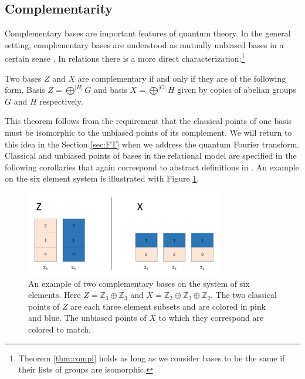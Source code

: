 \subsection{Complementarity}
Complementary bases are important features of quantum theory. In the general setting, complementary bases are understood as mutually unbiased bases in a certain sense \cite{coecke2011interacting}.  In relations there is a more direct characterization:\footnote{Theorem \ref{thm:compl} holds as long as we consider bases to be the same if their lists of groups are isomorphic.}
\begin{theorem}
\label{thm:compl}
Two bases $Z$ and $X$ are complementary if and only if they are of the following form. Basis $Z = \bigoplus^{|H|}G$ and basis $X = \bigoplus^{|G|}H$ given by copies of abelian groups $G$ and $H$ respectively.
\end{theorem}

This theorem follows from the requirement that the classical points of one basis must be isomorphic to the unbiased points of its complement. We will return to this idea in the Section \ref{sec:FT} when we address the quantum Fourier transform. Classical and unbiased points of bases in the relational model are specified in the following corollaries that again correspond to abstract definitions in \cite{coecke2011interacting}. An example on the six element system is illustrated with Figure \ref{complEx}.

\begin{figure}[tb]
\begin{center}
\includegraphics[height=10em,natwidth=1091,natheight=468,scale=1]{images/complexample.png}
\end{center}
\vspace{-14pt}
\caption{An example of two complementary bases on the system of six elements. Here $Z=\mathbb{Z}_3\oplus\mathbb{Z}_3$ and $X = \mathbb{Z}_2\oplus\mathbb{Z}_2\oplus \mathbb{Z}_2$.  The two classical points of $Z$ are each three element subsets and are colored in pink and blue. The unbiased points of $X$ to which they correspond are colored to match.
}
\label{complEx}
\end{figure}

